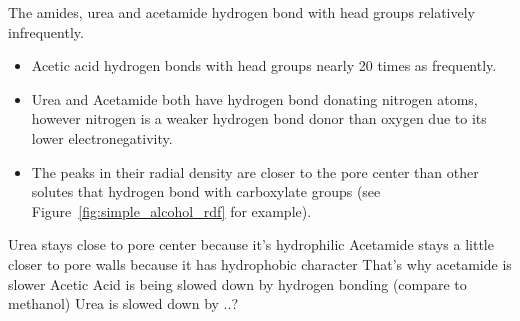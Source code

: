 \documentclass{article}
\begin{document}
  The amides, urea and acetamide hydrogen bond with head groups relatively infrequently.
  \begin{itemize}
    \item Acetic acid hydrogen bonds with head groups nearly 20 times as frequently.
    \item Urea and Acetamide both have hydrogen bond donating nitrogen atoms, however
  	nitrogen is a weaker hydrogen bond donor than oxygen due to its lower electronegativity.
    \item The peaks in their radial density are closer to the pore center than 
    other solutes that hydrogen bond with carboxylate groups (see 
    Figure~\ref{fig:simple_alcohol_rdf} for example).
  \end{itemize}   
  
  Urea stays close to pore center because it's hydrophilic
  Acetamide stays a little closer to pore walls because it has hydrophobic character
  That's why acetamide is slower
  Acetic Acid is being slowed down by hydrogen bonding (compare to methanol)
  Urea is slowed down by ..?
  
\end{document}
